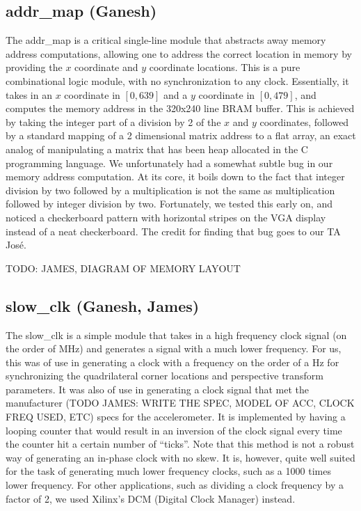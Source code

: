 \documentclass{article}
\begin{document}
\subsection{addr\_map (Ganesh)}
The addr\_map is a critical single-line module that abstracts away memory address computations,
allowing one to address the correct location in memory by providing the $x$ coordinate and $y$ coordinate locations.
This is a pure combinational logic module, with no synchronization to any clock.
Essentially, it takes in an $x$ coordinate in $[0, 639]$ and a $y$ coordinate in $[0, 479]$,
and computes the memory address in the 320x240 line BRAM buffer.
This is achieved by taking the integer part of a division by 2 of the $x$ and $y$ coordinates,
followed by a standard mapping of a 2 dimensional matrix address to a flat array,
an exact analog of manipulating a matrix that has been heap allocated in the C programming language.
We unfortunately had a somewhat subtle bug in our memory address computation.
At its core, it boils down to the fact that integer division by two followed by a multiplication is not the same as multiplication followed by integer division by two.
Fortunately, we tested this early on, and noticed a checkerboard pattern with horizontal stripes on the VGA display instead of a neat checkerboard.
The credit for finding that bug goes to our TA Jos\'{e}.

TODO: JAMES, DIAGRAM OF MEMORY LAYOUT

\subsection{slow\_clk (Ganesh, James)}
The slow\_clk is a simple module that takes in a high frequency clock signal (on the order of MHz)
and generates a signal with a much lower frequency.
For us,
this was of use in generating a clock with a frequency on the order of a Hz for synchronizing the quadrilateral corner locations and perspective transform parameters.
It was also of use in generating a clock signal that met the manufacturer (TODO JAMES: WRITE THE SPEC, MODEL OF ACC, CLOCK FREQ USED, ETC) specs for the accelerometer.
It is implemented by having a looping counter that would result in an inversion of the clock signal every time the counter hit a certain number of ``ticks''.
Note that this method is not a robust way of generating an in-phase clock with no skew.
It is, however, quite well suited for the task of generating much lower frequency clocks, such as a 1000 times lower frequency.
For other applications, such as dividing a clock frequency by a factor of 2, we used Xilinx's DCM (Digital Clock Manager) instead.
\end{document}
